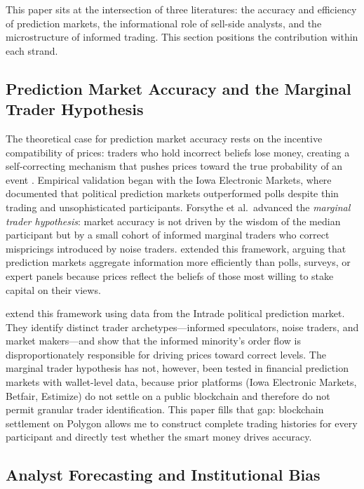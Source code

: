 \documentclass[11pt]{article}
\begin{document}
This paper sits at the intersection of three literatures: the accuracy and efficiency of prediction markets, the informational role of sell-side analysts, and the microstructure of informed trading. This section positions the contribution within each strand.

\subsection{Prediction Market Accuracy and the Marginal Trader Hypothesis}

The theoretical case for prediction market accuracy rests on the incentive compatibility of prices: traders who hold incorrect beliefs lose money, creating a self-correcting mechanism that pushes prices toward the true probability of an event \citep{hayek1945use, arrow2008promise}. Empirical validation began with the Iowa Electronic Markets, where \citet{forsythe1992anatomy} documented that political prediction markets outperformed polls despite thin trading and unsophisticated participants. Forsythe et al.\ advanced the \textit{marginal trader hypothesis}: market accuracy is not driven by the wisdom of the median participant but by a small cohort of informed marginal traders who correct mispricings introduced by noise traders. \citet{wolfers2004prediction} extended this framework, arguing that prediction markets aggregate information more efficiently than polls, surveys, or expert panels because prices reflect the beliefs of those most willing to stake capital on their views.

\citet{rothschild2016trading} extend this framework using data from the Intrade political prediction market. They identify distinct trader archetypes---informed speculators, noise traders, and market makers---and show that the informed minority's order flow is disproportionately responsible for driving prices toward correct levels. The marginal trader hypothesis has not, however, been tested in financial prediction markets with wallet-level data, because prior platforms (Iowa Electronic Markets, Betfair, Estimize) do not settle on a public blockchain and therefore do not permit granular trader identification. This paper fills that gap: blockchain settlement on Polygon allows me to construct complete trading histories for every participant and directly test whether the smart money drives accuracy.

\subsection{Analyst Forecasting and Institutional Bias}
\end{document}

